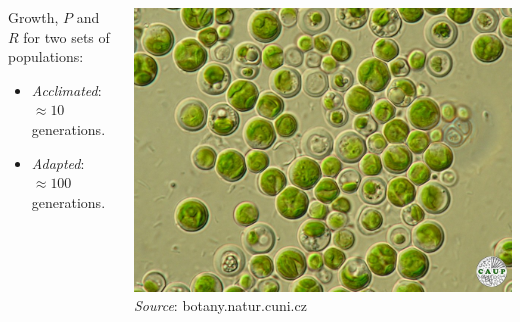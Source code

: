 \documentclass{beamer}
\begin{document}
\begin{frame}
\begin{columns}
\begin{column}{0.55\textwidth}
      Growth, $P$ and $R$ for two sets of populations:
      \begin{itemize}
        \item \textit{Acclimated}: $\approx 10$ generations. 
        \item \textit{Adapted}: $\approx 100$ generations. 
      \end{itemize}
    \end{column}
    \begin{column}{0.42\textwidth}
      \begin{center}
        \includegraphics[width=\textwidth]{figs/chlorella.JPG}\\[-8pt]
        {\tiny \textit{Source}: botany.natur.cuni.cz}
      \end{center}
    \end{column}
  \end{columns}

\end{frame}
\end{document}
